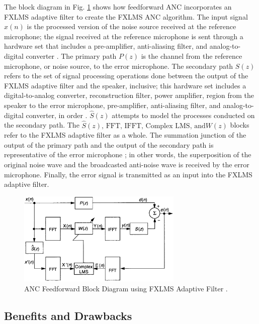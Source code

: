 \documentclass[11pt, letterpaper]{article}
\numberwithin{equation}{section}
\begin{document}
The block diagram in Fig. \ref{fig:ANC_FXLMS} shows how feedforward ANC incorporates an FXLMS adaptive filter to create the FXLMS ANC algorithm. The input signal $x(n)$ is the processed version of the noise source received at the reference microphone; the signal received at the reference microphone is sent through a hardware set that includes a pre-amplifier, anti-aliasing filter, and analog-to-digital converter \cite{kajikawa}. The primary path $P(z)$ is the channel from the reference microphone, or noise source, to the error microphone. The secondary path $S(z)$ refers to the set of signal processing operations done between the output of the FXLMS adaptive filter and the speaker, inclusive; this hardware set includes a digital-to-analog converter, reconstruction filter, power amplifier, region from the speaker to the error microphone, pre-amplifier, anti-aliasing filter, and analog-to-digital converter, in order \cite{kajikawa}. $\hat{S}(z)$ attempts to model the processes conducted on the secondary path. The $\hat{S}(z) \text{, FFT, IFFT, Complex LMS, and} W(z)$ blocks refer to the FXLMS adaptive filter as a whole. The summation junction of the output of the primary path and the output of the secondary path is representative of the error microphone \cite{kuo}; in other words, the superposition of the original noise wave and the broadcasted anti-noise wave is received by the error microphone. Finally, the error signal is transmitted as an input into the FXLMS adaptive filter.

 \begin{figure}[H]
 	\begin{center}
 		\includegraphics[height=0.3\textheight, width=0.7\textwidth]{images/kuo_ANC_FXLMS_fdfw.png}
 		\caption{ANC Feedforward Block Diagram using FXLMS Adaptive Filter \cite{kuo}.}
 		\label{fig:ANC_FXLMS}
 	\end{center}
 \end{figure}

\subsection{Benefits and Drawbacks}
\end{document}
